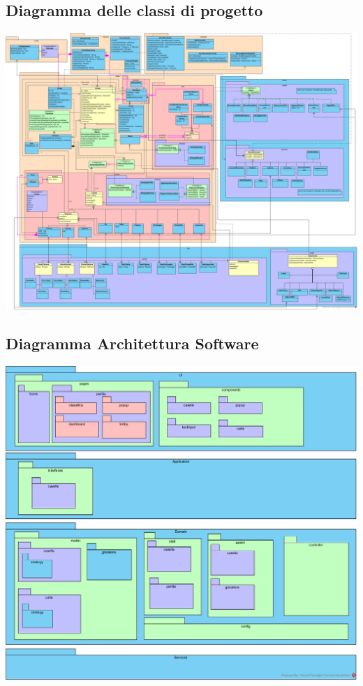 \documentclass{article}
\begin{document}
\subsection{Diagramma delle classi di progetto}
\href{https://github.com/UnimibSoftEngCourse2022/progetto-monopoly-1-gangoffour2/blob/feat/doc/doc/img/DiagrammaDelleClassi.jpg?raw=true}
	{\includegraphics[width=\textwidth]{img/DiagrammaDelleClassi.jpg}}


\subsection{Diagramma Architettura Software}
\href{https://github.com/UnimibSoftEngCourse2022/progetto-monopoly-1-gangoffour2/blob/feat/doc/doc/img/Diagramma_Architettura_Software.jpg?raw=true}
	{\includegraphics[width=\textwidth]{Diagramma_Architettura_Software}}
\end{document}
